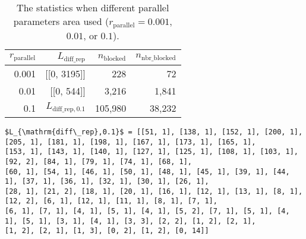 \documentclass[ijgi,article,submit,moreauthors,pdftex]{Definitions/mdpi}
\begin{document}
\begin{table}[tb]
\centering
\caption{The statistics when different parallel parameters area used 
(\ie$r_\mathrm{parallel}=0.001$, $0.01$, or $0.1$).}
\begin{tabular}{rrrr}
\hline
$r_\mathrm{parallel}$   & $L_\mathrm{diff\_rep}$        & $n_\mathrm{blocked}$  & $n_\mathrm{nbr\_blocked}$ \\ \hline
0.001                   & [[0, 3195]]                   &       228             &       72                  \\
0.01                    & [[0, 544]]                    &   3{,}216             &  1{,}841                  \\
0.1                     & $L_{\mathrm{diff\_rep}, 0.1}$ & 105{,}980             & 38{,}232                  \\ \hline 
\end{tabular}
\begin{Verbatim}[fontfamily=normal,commandchars=\\\{\},
codes={\catcode`$=3\catcode`^=7\catcode`_=8}]
$L_{\mathrm{diff\_rep},0.1}$ = [[51, 1], [138, 1], [152, 1], [200, 1], [205, 1], [181, 1], [198, 1], [167, 1], [173, 1], [165, 1], 
[153, 1], [143, 1], [140, 1], [127, 1], [125, 1], [108, 1], [103, 1], [92, 2], [84, 1], [79, 1], [74, 1], [68, 1], 
[60, 1], [54, 1], [46, 1], [50, 1], [48, 1], [45, 1], [39, 1], [44, 1], [37, 1], [36, 1], [32, 1], [30, 1], [26, 1], 
[28, 1], [21, 2], [18, 1], [20, 1], [16, 1], [12, 1], [13, 1], [8, 1], [12, 2], [6, 1], [12, 1], [11, 1], [8, 1], [7, 1], 
[6, 1], [7, 1], [4, 1], [5, 1], [4, 1], [5, 2], [7, 1], [5, 1], [4, 1], [5, 1], [3, 1], [4, 1], [3, 3], [2, 2], [1, 2], [2, 1], 
[1, 2], [2, 1], [1, 3], [0, 2], [1, 2], [0, 14]]
\end{Verbatim}

\end{table}
\end{document}
